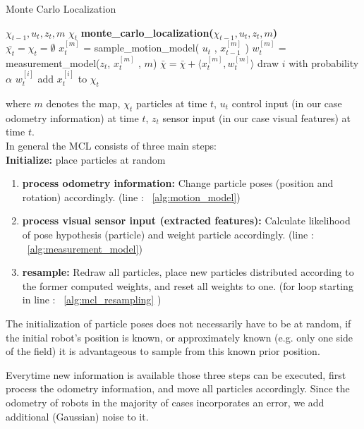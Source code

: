 \documentclass[	DIV=calc,%
							paper=a4,%
							fontsize=9pt,%
							twocolumn]{scrartcl}	 					%
\begin{document}
\begin{algorithm}[h!]
\caption{Monte Carlo Localization}
\begin{algorithmic}[1]
$\chi_{t-1}, u_t, z_t,m$
$\chi_t$
\STATE \textbf{monte\_carlo\_localization(}$\chi_{t-1}, u_t, z_t,m$\textbf{)}\\
\STATE $\bar{\chi_t} = \chi_t = \emptyset$
\STATE {}$x^{[m]}_t$ = sample\_motion\_model( $u_t$ , $x^{[m]}_{t-1}$ )\;\label{alg:motion_model}
\STATE {}$w^{[m]}_t$ = measurement\_model($z_t$, $x^{[m]}_t$ , $m$)\;\label{alg:measurement_model}
\STATE {}$\bar{\chi} = \bar{\chi} + \langle x^{[m]}_t, w^{[m]}_t \rangle $\;
\ENDFOR
{} \label{alg:mcl_resampling}
\STATE draw $i$ with probability $\alpha$  $w^{[i]}_t$\;
\STATE add $x^{[i]}_t $ to $\chi_t$\;
\ENDFOR
\end{algorithmic}
\end{algorithm}


where $m$ denotes the map, $\chi_t$ particles at time $t$, $u_t$ control input (in our case odometry information) at time $t$, $z_t$ sensor input (in our case visual features) at time $t$.
\\
In general the MCL consists of three main steps:\\
\textbf{Initialize:} place particles at random
\begin{enumerate}
\item \textbf{process odometry information:} Change particle poses (position and rotation) accordingly. (line : ~\ref{alg:motion_model})
\item \textbf{process visual sensor input (extracted features):} Calculate likelihood of pose hypothesis (particle) and weight particle accordingly. (line : ~\ref{alg:measurement_model})
\item \textbf{resample:} Redraw all particles, place new particles distributed according to the former computed weights, and reset all weights to one. (for loop starting in line :  ~\ref{alg:mcl_resampling} ) %
\end{enumerate}
The initialization of particle poses does not necessarily have to be at random, if the initial robot's position is known, or approximately known (e.g. only one side of the field) it is advantageous to sample from this known prior position.

Everytime new information is available those three steps can be executed, first process the odometry information, and move all particles accordingly. Since the odometry of robots in the majority of cases incorporates an error, we add additional (Gaussian) noise to it.
\end{document}
